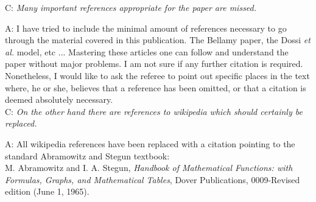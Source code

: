 \documentclass[a4paper,11pt]{article}
\begin{document}
C: \emph{Many important references appropriate for the paper are missed.}

A: I have tried to include the minimal amount of references necessary to go through the material covered in this publication. 
The Bellamy paper, the Dossi \emph{et al.} model, etc ... Mastering these articles one can follow and understand the paper without major problems. 
I am not sure if any further citation is required. 
Nonetheless, I would like to ask the referee to point out specific places in the text where, he or she, believes that a reference has been omitted, or that a citation is deemed absolutely necessary.  
\\[1ex]

C: \emph{On the other hand there are references to wikipedia which should certainly be replaced. }

A: All wikipedia references have been replaced with a citation pointing to the standard Abramowitz and Stegun textbook:
\\[1ex]

M. Abramowitz and I. A. Stegun, \emph{Handbook of Mathematical Functions: with Formulas, Graphs, and Mathematical Tables}, Dover Publications, 0009-Revised edition (June 1, 1965).  
\end{document}
